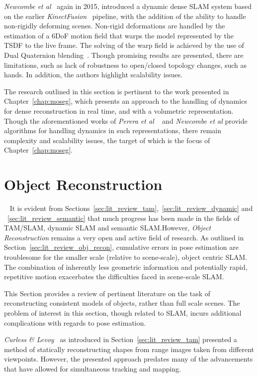 \textit{Newcombe et al}~\cite{Newcombe2015} again in 2015, introduced a dynamic dense SLAM 
system based on the earlier \textit{KinectFusion}~\cite{Newcombe2015} pipeline, with the addition 
of the ability to handle non-rigidly deforming scenes. Non-rigid deformations are handled by the 
estimation of a 6DoF motion field that warps the model represented by the TSDF to the live frame. The 
solving of the warp field is achieved by the use of Dual Quaternion blending~\cite{Kavan2006}. 
Though promising results are presented, there are limitations, such as lack of robustness to 
open/closed topology changes, such as hands. In addition, the authors highlight scalability issues.

The research outlined in this section is pertinent to the work presented in Chapter~\ref{chap:moseg}, 
which presents an approach to the handling of dynamics for dense reconstruction in real time, and 
with a volumetric representation. Though the aforementioned works of \textit{Perera et al}
~\cite{Perera2015} and \textit{Newcombe et al} provide algorithms for handling dynamics in such 
representations, there remain complexity and scalability issues, the target of which is the focus of 
Chapter~\ref{chap:moseg}.

\section{Object Reconstruction}
~\label{sec:lit_review_obj_recon}
It is evident from Sections~\ref{sec:lit_review_tam},~\ref{sec:lit_review_dynamic} and 
~\ref{sec:lit_review_semantic} that much progress has been made in the fields of TAM/SLAM, 
dynamic SLAM and semantic SLAM.\@ However, \textit{Object Reconstruction} remains a very open 
and active field of research. As outlined in Section~\ref{sec:lit_review_obj_recon}, cumulative 
errors in pose estimation are troublesome for the smaller scale (relative to scene-scale), 
object centric SLAM\@. The combination of inherently less geometric information and potentially 
rapid, repetitive motion exacerbates the difficulties faced in scene-scale SLAM\@.

This Section provides a review of pertinent literature on the task of reconstructing consistent 
models of objects, rather than full scale scenes. The problem of interest in this section, though 
related to SLAM, incurs additional complications with regards to pose estimation.

\textit{Curless \& Levoy}~\cite{Curless1996} as introduced in Section~\ref{sec:lit_review_tam} 
presented a method of statically reconstructing shapes from range images taken from different 
viewpoints. However, the presented approach predates many of the advancements that have allowed 
for simultaneous tracking and mapping.

